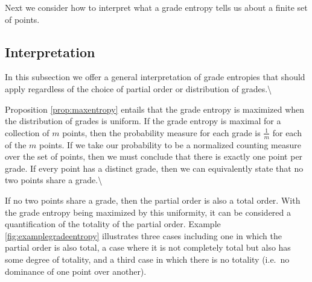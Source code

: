 \documentclass[
  letterpaper,
  DIV=11,
  numbers=noendperiod]{scrreprt}
\begin{document}
Next we consider how to interpret what a grade entropy tells us about a
finite set of points.

\subsection{Interpretation}\label{interpretation-4}

In this subsection we offer a general interpretation of grade entropies
that should apply regardless of the choice of partial order or
distribution of grades.\textbackslash{}

Proposition \ref{prop:maxentropy} entails that the grade entropy is
maximized when the distribution of grades is uniform. If the grade
entropy is maximal for a collection of \(m\) points, then the
probability measure for each grade is \(\frac{1}{m}\) for each of the
\(m\) points. If we take our probability to be a normalized counting
measure over the set of points, then we must conclude that there is
exactly one point per grade. If every point has a distinct grade, then
we can equivalently state that no two points share a
grade.\textbackslash{}

If no two points share a grade, then the partial order is also a total
order. With the grade entropy being maximized by this uniformity, it can
be considered a quantification of the totality of the partial order.
Example \ref{fig:examplegradeentropy} illustrates three cases including
one in which the partial order is also total, a case where it is not
completely total but also has some degree of totality, and a third case
in which there is no totality (i.e.~no dominance of one point over
another).
\end{document}
